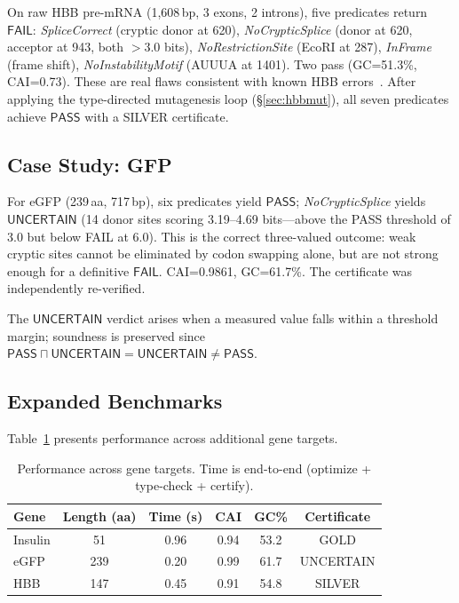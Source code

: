 \documentclass[runningheads]{llncs}
\newcommand{\PASS}{\ensuremath{\mathsf{PASS}}\xspace}
\newcommand{\FAIL}{\ensuremath{\mathsf{FAIL}}\xspace}
\newcommand{\UNCERTAIN}{\ensuremath{\mathsf{UNCERTAIN}}\xspace}
\newcommand{\tand}{\sqcap}
\begin{document}
On raw HBB pre-mRNA (1,608\,bp, 3 exons, 2 introns), five predicates return \FAIL: \emph{SpliceCorrect} (cryptic donor at 620), \emph{NoCrypticSplice} (donor at 620, acceptor at 943, both $>$3.0 bits), \emph{NoRestrictionSite} (EcoRI at 287), \emph{InFrame} (frame shift), \emph{NoInstabilityMotif} (AUUUA at 1401). Two pass (GC=51.3\%, CAI=0.73). These are real flaws consistent with known HBB errors~\cite{thein1998beta}.
After applying the type-directed mutagenesis loop (\S\ref{sec:hbbmut}), all seven predicates achieve \PASS{} with a SILVER certificate.

\subsection{Case Study: GFP}

For eGFP (239\,aa, 717\,bp), six predicates yield \PASS; \emph{NoCrypticSplice} yields \UNCERTAIN{} (14 donor sites scoring 3.19--4.69 bits---above the PASS threshold of 3.0 but below FAIL at 6.0). This is the correct three-valued outcome: weak cryptic sites cannot be eliminated by codon swapping alone, but are not strong enough for a definitive \FAIL. CAI=0.9861, GC=61.7\%. The certificate was independently re-verified.

The \UNCERTAIN{} verdict arises when a measured value falls within a threshold margin; soundness is preserved since $\PASS \tand \UNCERTAIN = \UNCERTAIN \neq \PASS$.

\subsection{Expanded Benchmarks}

Table~\ref{tab:benchmarks} presents performance across additional gene targets.

\begin{table}[t]
\centering
\caption{Performance across gene targets. Time is end-to-end (optimize + type-check + certify).}
\label{tab:benchmarks}
\begin{tabular}{lccccc}
\toprule
\textbf{Gene} & \textbf{Length (aa)} & \textbf{Time (s)} & \textbf{CAI} & \textbf{GC\%} & \textbf{Certificate} \\
\midrule
Insulin  & 51  & 0.96 & 0.94 & 53.2 & GOLD \\
eGFP     & 239 & 0.20 & 0.99 & 61.7 & UNCERTAIN \\
HBB      & 147 & 0.45 & 0.91 & 54.8 & SILVER \\
\bottomrule
\end{tabular}
\end{table}
\end{document}
